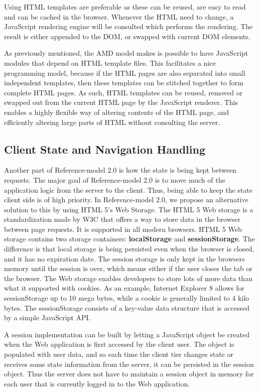 Using HTML templates are preferable as these can be reused, are easy to read and can be cached in the browser. Whenever the HTML need to change, a JavaScript rendering engine will be consulted which performs the rendering. The result is either appended to the DOM, or swapped with current DOM elements.

As previously mentioned, the AMD model makes is possible to have JavaScript modules that depend on HTML template files. This facilitates a nice programming model, because if the HTML pages are also separated into small independent templates, then these templates can be stitched together to form complete HTML pages. As such, HTML templates can be reused, removed or swapped out from the current HTML page by the JavaScript renderer. This enables a highly flexible way of altering contents of the HTML page, and efficiently altering large parts of HTML without consulting the server.
		
\subsection{Client State and Navigation Handling}
Another part of Reference-model 2.0 is how the state is being kept between requests. The major goal of Reference-model 2.0 is to move much of the application logic from the server to the client. Thus, being able to keep the state client side is of high priority. In Reference-model 2.0, we propose an alternative solution to this by using HTML 5's Web Storage\cite{webstorage}. The HTML 5 Web storage is a standardization made by W3C that offers a way to store data in the browser between page requests. It is supported in all modern browsers. HTML 5 Web storage contains two storage containers: \textbf{localStorage} and \textbf{sessionStorage}. The difference is that local storage is being persisted even when the browser is closed, and it has no expiration date. The session storage is only kept in the browsers memory until the session is over, which means either if the user closes the tab or the browser. The Web storage enables developers to store lots of more data than what it supported with cookies. As an example, Internet Explorer 8 allows for sessionStorage up to 10 mega bytes, while a cookie is generally limited to 4 kilo bytes. The sessionStorage consists of a key-value data structure that is accessed by a simple JavaScript API.
	
A session implementation can be built by letting a JavaScript object be created when the Web application is first accessed by the client user. The object is populated with user data, and so each time the client tier changes state or receives some state information from the server, it can be persisted in the session object. Thus the server does not have to maintain a session object in memory for each user that is currently logged in to the Web application.

